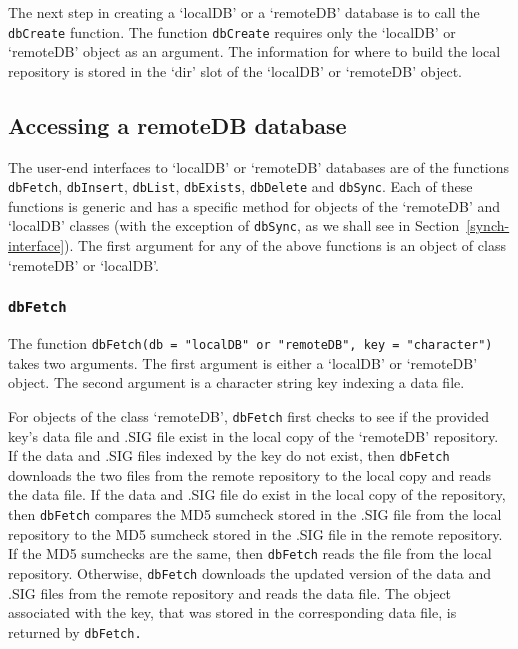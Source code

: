 \documentclass{article}
\newcommand{\code}{\texttt}
\begin{document}
The next step in creating a `localDB' or a `remoteDB' 
database is to call the \code{dbCreate} function.  The function \code{dbCreate} 
requires only the `localDB' or `remoteDB' object as an argument. The
information for where to build the local repository is stored in the `dir' slot
of the `localDB' or `remoteDB' object.


\subsection{Accessing a remoteDB database}

The user-end interfaces to `localDB' or `remoteDB' databases 
are of the functions \code{dbFetch}, \code{dbInsert}, \code{dbList}, 
\code{dbExists}, \code{dbDelete} and \code{dbSync}.  Each of these functions 
is generic and has a specific method for objects of the 
`remoteDB' and `localDB' classes (with the exception of \code{dbSync}, 
as we shall see in Section~\ref{synch-interface}). The first argument for any of the 
above functions is an object of class `remoteDB' or `localDB'.

\subsubsection{\code{dbFetch}}

The function \code{dbFetch(db = "localDB" or "remoteDB", 
key = "character")} takes two arguments. The first argument is either a 
`localDB' or `remoteDB' object. The second argument is a 
character string key indexing a data file. 

For objects of the class `remoteDB', \code{dbFetch} first checks to 
see if the provided key's data file and .SIG file exist 
in the local copy of the `remoteDB' repository. If the data and .SIG files
indexed by the key do not exist, then \code{dbFetch} downloads the 
two files from the remote repository to the local copy and reads the data file. 
If the data and .SIG file do exist in the local copy of the repository, then
\code{dbFetch} compares the MD5 sumcheck stored in the .SIG file from the local 
repository to the MD5 sumcheck stored in the .SIG file in the remote 
repository. If the MD5 sumchecks are the same, then \code{dbFetch} reads 
the file from the local repository. Otherwise, \code{dbFetch} downloads 
the updated version of the data and .SIG files from the remote repository
and reads the data file. The object associated with the key, that was 
stored in the corresponding data file, is returned by \code{dbFetch.}
\end{document}
